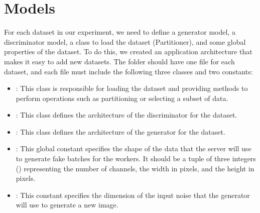 

\section{Models}
For each dataset in our experiment, we need to define a generator model, a discriminator model, a class to load the dataset (Partitioner), and some global properties of the dataset. To do this, we created an application architecture that makes it easy to add new datasets. The  folder should have one file for each dataset, and each file must include the following three classes and two constants:
\begin{itemize}
    \item {}: This class is responsible for loading the dataset and providing methods to perform operations such as partitioning or selecting a subset of data.
    \item {}: This class defines the architecture of the discriminator for the dataset.
    \item {}: This class defines the architecture of the generator for the dataset.
    \item {}: This global constant specifies the shape of the data that the server will use to generate fake batches for the workers. It should be a tuple of three integers () representing the number of channels, the width in pixels, and the height in pixels.
    \item {}: This constant specifies the dimension of the input noise that the generator will use to generate a new image.
\end{itemize}

